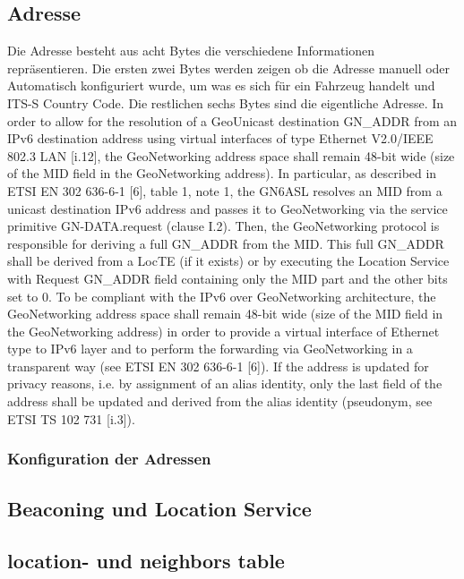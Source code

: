 \subsection{ Adresse}
Die  Adresse besteht aus acht Bytes die verschiedene Informationen repräsentieren. Die ersten zwei Bytes werden zeigen ob die Adresse manuell oder Automatisch konfiguriert wurde, um was es sich für ein Fahrzeug handelt und ITS-S Country Code. Die restlichen sechs Bytes sind die eigentliche Adresse.
In order to allow for the resolution of a GeoUnicast destination GN_ADDR from an IPv6 destination address using virtual interfaces of type Ethernet V2.0/IEEE 802.3 LAN [i.12], the GeoNetworking address space shall remain 48-bit wide (size of the MID field in the GeoNetworking address). In particular, as described in ETSI EN 302 636-6-1 [6], table 1, note 1, the GN6ASL resolves an MID from a unicast destination IPv6 address and passes it to GeoNetworking via the service primitive GN-DATA.request (clause I.2). Then, the GeoNetworking protocol is responsible for deriving a full GN_ADDR from the MID. This full GN_ADDR shall be derived from a LocTE (if it exists) or by executing the Location Service with Request GN_ADDR field containing only the MID part and the other bits set to 0.
To be compliant with the IPv6 over GeoNetworking architecture, the GeoNetworking address space shall remain 48-bit wide (size of the MID field in the GeoNetworking address) in order to provide a virtual interface of Ethernet type to IPv6 layer and to perform the forwarding via GeoNetworking in a transparent way (see ETSI EN 302 636-6-1 [6]).
If the address is updated for privacy reasons, i.e. by assignment of an alias identity, only the last field of the address shall be updated and derived from the alias identity (pseudonym, see ETSI TS 102 731 [i.3]).
\subsubsection{Konfiguration der Adressen}
\subsection{Beaconing und Location Service}

\subsection{location- und neighbors table}


